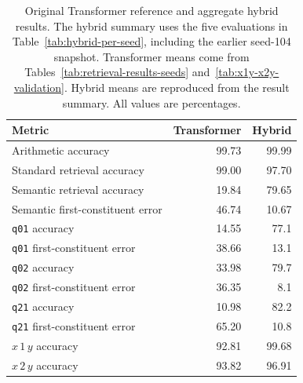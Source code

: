\begin{table}[!htbp]
\centering
\small
\setlength{\tabcolsep}{7pt}
\renewcommand{\arraystretch}{1.12}
\caption{Original Transformer reference and aggregate hybrid results. The
hybrid summary uses the five evaluations in Table~\ref{tab:hybrid-per-seed},
including the earlier seed-104 snapshot. Transformer means come from
Tables~\ref{tab:retrieval-results-seeds} and~\ref{tab:x1y-x2y-validation}.
Hybrid means are reproduced from the result summary. All values are percentages.}
\label{tab:hybrid-summary}
\begin{tabular}{@{}lrr@{}}
\toprule
Metric & Transformer & Hybrid \\
\midrule
Arithmetic accuracy & 99.73 & 99.99 \\
Standard retrieval accuracy & 99.00 & 97.70 \\
Semantic retrieval accuracy & 19.84 & 79.65 \\
Semantic first-constituent error & 46.74 & 10.67 \\
\midrule
\texttt{q01} accuracy & 14.55 & 77.1 \\
\texttt{q01} first-constituent error & 38.66 & 13.1 \\
\texttt{q02} accuracy & 33.98 & 79.7 \\
\texttt{q02} first-constituent error & 36.35 & 8.1 \\
\texttt{q21} accuracy & 10.98 & 82.2 \\
\texttt{q21} first-constituent error & 65.20 & 10.8 \\
\midrule
\(x\,1\,y\) accuracy & 92.81 & 99.68 \\
\(x\,2\,y\) accuracy & 93.82 & 96.91 \\
\bottomrule
\end{tabular}
\end{table}
